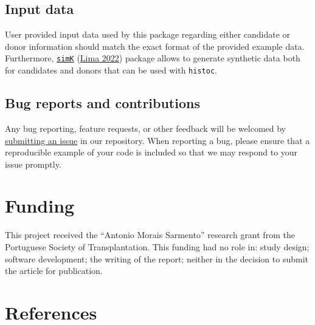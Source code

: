 \documentclass[
]{article}
\begin{document}
\hypertarget{input-data}{%
\subsection{Input data}\label{input-data}}

User provided input data used by this package regarding either candidate
or donor information should match the exact format of the provided
example data. Furthermore,
\href{https://github.com/txopen/simK}{\texttt{simK}}
(\protect\hyperlink{ref-simK}{Lima 2022}) package allows to generate
synthetic data both for candidates and donors that can be used with
\texttt{histoc}.

\hypertarget{bug-reports-and-contributions}{%
\subsection{Bug reports and
contributions}\label{bug-reports-and-contributions}}

Any bug reporting, feature requests, or other feedback will be welcomed
by \href{https://github.com/txopen/histoc/issues}{submitting an issue}
in our repository. When reporting a bug, please ensure that a
reproducible example of your code is included so that we may respond to
your issue promptly.

\hypertarget{funding}{%
\section{Funding}\label{funding}}

This project received the ``Antonio Morais Sarmento'' research grant
from the Portuguese Society of Transplantation. This funding had no role
in: study design; software development; the writing of the report;
neither in the decision to submit the article for publication.

\hypertarget{references}{%
\section*{References}\label{references}}
\end{document}
